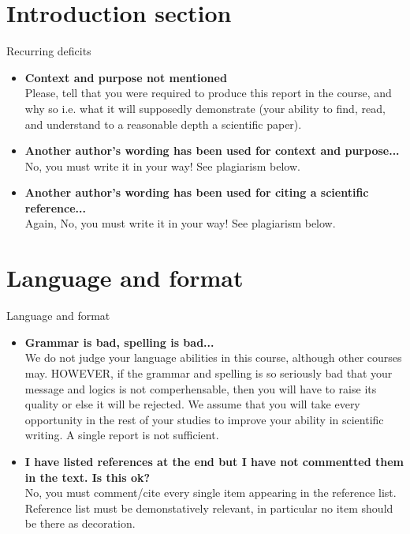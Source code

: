 \documentclass[pdf]{beamer}
\begin{document}
\section{Introduction section} 
\begin{frame}{Recurring deficits } 
\begin{itemize}
  \item {\bf  Context and purpose not mentioned}\\
Please, tell that you were required to produce this report in the
course, and why so i.e. 
what it will supposedly demonstrate (your ability to find, read, and understand to a reasonable depth a scientific paper). 
\item {\bf  Another author's wording has been used for context and purpose...}\\
No, you must write it in your  way!  See  plagiarism below.
\item {\bf  Another author's wording has been used for citing a scientific reference...}\\
Again, No, you must write it in your  way! See  plagiarism below.
\end{itemize}
\end{frame} 

\section{Language and format} 
\begin{frame}{Language and format}
\begin{itemize}
\item {\bf Grammar is bad, spelling is bad...}   \\
We do not judge your language abilities in this course, although other courses may. HOWEVER, if the grammar and spelling is so seriously bad that your message 
and logics is not comperhensable, then you will have to raise its quality or else it will be rejected. We assume  that you will take every opportunity
in the rest of your studies to improve your ability in scientific writing.  A single report
is not sufficient.
\item {\bf I have listed references at the end but I have not commentted them in the text. Is this ok?} \\
No, you must comment/cite every single item appearing in the reference
list. Reference list must be demonstatively relevant, in particular  no item should be there as   decoration.
\end{itemize}
 \end{frame} 
\end{document}
